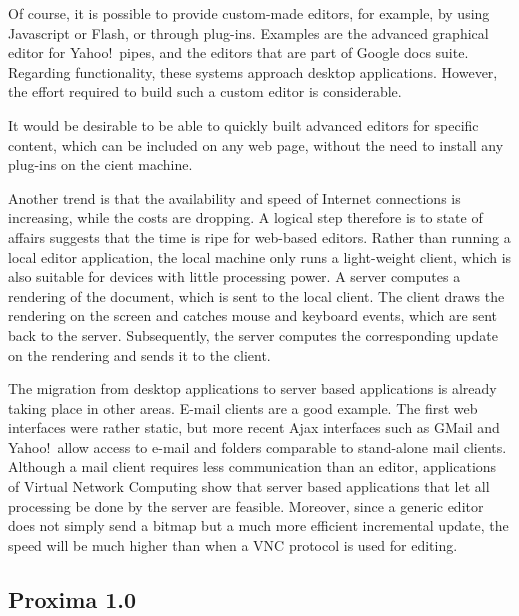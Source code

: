 \documentclass[10pt]{article}
\begin{document}
Of course, it is possible to provide custom-made editors, for example, by using Javascript or Flash, or through plug-ins. Examples are the advanced graphical editor for Yahoo!\ pipes, and the editors that are part of Google docs suite. Regarding functionality, these systems approach desktop applications. However, the effort required to build such a custom editor is considerable.

It would be desirable to be able to quickly built advanced editors for specific content, which can be included on any web page, without the need to install any plug-ins on the cient machine.


\bc
Another trend is that the availability and speed of Internet connections is increasing, while the costs are dropping. A logical step therefore is to state of affairs suggests that the time is ripe for web-based editors. Rather than running a local editor application, the local machine only runs a light-weight client, which is also suitable for devices with little processing power. A server computes a rendering of the document, which is sent to the local client. The client draws the rendering on the screen and catches mouse and keyboard events, which are sent back to the server. Subsequently, the server computes the corresponding update on the rendering and sends it to the client.

The migration from desktop applications to server based applications is already taking place in other areas. E-mail clients are a good example. The first web interfaces were rather static, but more recent Ajax interfaces such as GMail and Yahoo!\ allow access to e-mail and folders comparable to stand-alone mail clients. Although a mail client requires less communication than an editor, applications of Virtual Network Computing show that server based applications that let all processing be done by the server are feasible. Moreover, since a generic editor does not simply send a bitmap but a much more efficient incremental update, the speed will be much higher than when a VNC protocol is used for editing. 
\ec

\subsection{Proxima 1.0}
\end{document}
